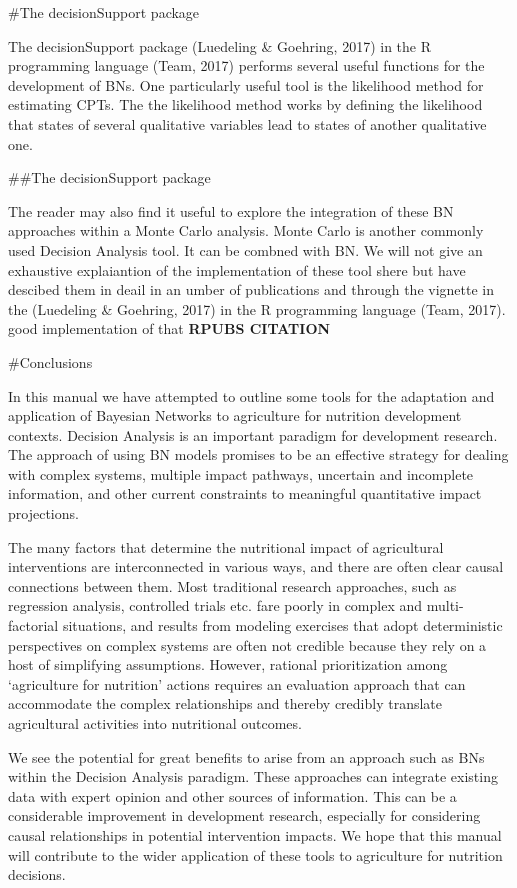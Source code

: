 \documentclass[
]{article}
\begin{document}
\#The decisionSupport package

The decisionSupport package (Luedeling \& Goehring, 2017) in the R
programming language (Team, 2017) performs several useful functions for
the development of BNs. One particularly useful tool is the likelihood
method for estimating CPTs. The the likelihood method works by defining
the likelihood that states of several qualitative variables lead to
states of another qualitative one.

\#\#The decisionSupport package

The reader may also find it useful to explore the integration of these
BN approaches within a Monte Carlo analysis. Monte Carlo is another
commonly used Decision Analysis tool. It can be combned with BN. We will
not give an exhaustive explaiantion of the implementation of these tool
shere but have descibed them in deail in an umber of publications and
through the vignette in the (Luedeling \& Goehring, 2017) in the R
programming language (Team, 2017). good implementation of that
\textbf{RPUBS CITATION}

\#Conclusions

In this manual we have attempted to outline some tools for the
adaptation and application of Bayesian Networks to agriculture for
nutrition development contexts. Decision Analysis is an important
paradigm for development research. The approach of using BN models
promises to be an effective strategy for dealing with complex systems,
multiple impact pathways, uncertain and incomplete information, and
other current constraints to meaningful quantitative impact projections.

The many factors that determine the nutritional impact of agricultural
interventions are interconnected in various ways, and there are often
clear causal connections between them. Most traditional research
approaches, such as regression analysis, controlled trials etc. fare
poorly in complex and multi-factorial situations, and results from
modeling exercises that adopt deterministic perspectives on complex
systems are often not credible because they rely on a host of
simplifying assumptions. However, rational prioritization among
`agriculture for nutrition' actions requires an evaluation approach that
can accommodate the complex relationships and thereby credibly translate
agricultural activities into nutritional outcomes.

We see the potential for great benefits to arise from an approach such
as BNs within the Decision Analysis paradigm. These approaches can
integrate existing data with expert opinion and other sources of
information. This can be a considerable improvement in development
research, especially for considering causal relationships in potential
intervention impacts. We hope that this manual will contribute to the
wider application of these tools to agriculture for nutrition decisions.
\end{document}
